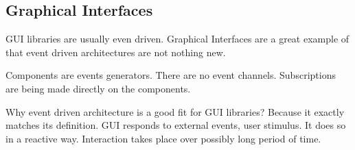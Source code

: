 \documentclass[12pt, a4paper]{article}
\begin{document}
\subsection{Graphical Interfaces}
GUI libraries are usually even driven. Graphical Interfaces are a great example of that event driven architectures are not nothing new. 

Components are events generators. There are no event channels. Subscriptions are being made directly on the components.

Why event driven architecture is a good fit for GUI libraries? Because it exactly matches its definition. GUI responds to external events, user stimulus. It does so in a reactive way. Interaction takes place over possibly long period of time.


  

\nocite{*}


\end{document}
